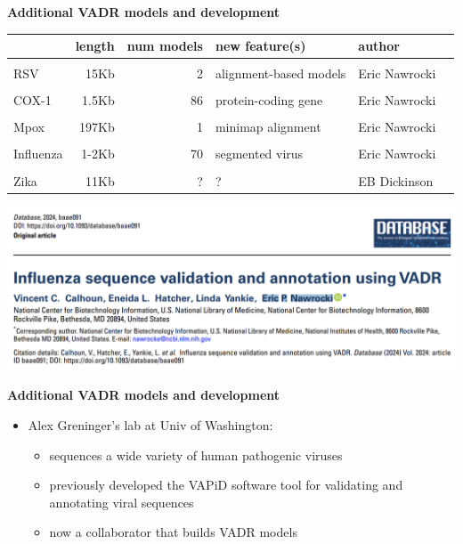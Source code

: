 \documentclass[landscape]{slides}
\begin{document}
\begin{slide}
\begin{center}
  \textbf{Additional VADR models and development}

\small
\begin{tabular}{l|r|r|l|l|l}
 & length & num models & new feature(s) & author\\ \hline
 & & & & & \\ 
RSV & 15Kb & 2 & alignment-based models & Eric Nawrocki \\
 & & & & & \\ 
COX-1 & 1.5Kb & 86 & protein-coding gene & Eric Nawrocki \\
 & & & & & \\ 
Mpox & 197Kb & 1 & minimap alignment & Eric Nawrocki \\
 & & & & & \\ 
Influenza & 1-2Kb & 70 & segmented virus & Eric Nawrocki \\
 & & & & & \\ 
Zika      & 11Kb & ? & ? & EB Dickinson \\
\end{tabular}

\includegraphics[width=10.5in]{figs/vadr-flu-paper}

\end{center}
  \vfill
\end{slide}
\begin{slide}
\begin{center}
  \textbf{Additional VADR models and development}
\end{center}

\begin{itemize}
  \item Alex Greninger's lab at Univ of Washington:
    \begin {itemize}
    \item sequences a wide variety of human pathogenic viruses
    \item previously developed the VAPiD software tool for validating
      and annotating viral sequences
    \item now a collaborator that builds VADR models
  \end{itemize}
\end{itemize}

  \vfill
\end{slide}
\end{document}
